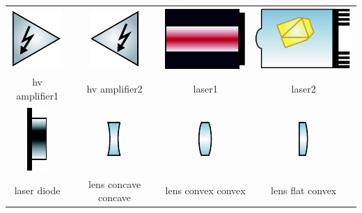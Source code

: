 \begin{table}
\begin{tabular}{|c|c|c|c|}
\includegraphics{contrib/optics_components/hv_amplifier1} & 
\includegraphics{contrib/optics_components/hv_amplifier2} & 
\includegraphics{contrib/optics_components/laser1} &
\includegraphics{contrib/optics_components/laser2}\\
\tiny hv amplifier1 & 
\tiny hv amplifier2 & 
\tiny laser1 &
\tiny laser2\\
\hline

\includegraphics{contrib/optics_components/laser_diode} & 
\includegraphics{contrib/optics_components/lens_concave_concave} &
\includegraphics{contrib/optics_components/lens_convex_convex} &
\includegraphics{contrib/optics_components/lens_flat_convex}\\
\tiny laser diode & 
\tiny lens concave concave &
\tiny lens convex convex &
\tiny lens flat convex\\
\hline


\end{tabular}
\end{table}
